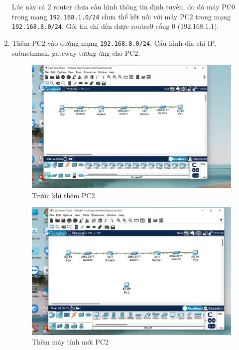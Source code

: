 \begin{enumerate}
Lúc này cả 2 router chưa cấu hình thông tin định tuyến, do đó máy PC0 trong mạng \texttt{192.168.1.0/24} chưa thể kết nối với máy PC2 trong mạng \texttt{192.168.8.0/24}. Gói tin chỉ đến được router0 cổng 0 (192.168.1.1).

\bf \item Thêm PC2 vào đường mạng \texttt{192.168.8.0/24}. Cấu hình địa chỉ IP, subnetmask, gateway tương ứng cho PC2.

\rm

\begin{figure}[H]
\begin{center}
\includegraphics[scale=0.4]{../figures/p1/p1-5a}
\end{center}
\caption{Trước khi thêm PC2}
\end{figure}

\begin{figure}[H]
\begin{center}
\includegraphics[scale=0.4]{../figures/p1/p1-5b}
\end{center}
\caption{Thêm máy tính mới PC2}
\end{figure}


\end{enumerate}
